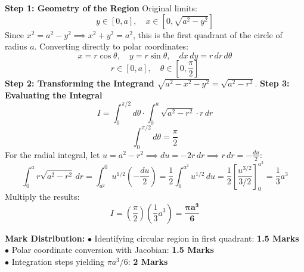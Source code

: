 \begin{solutionbox}
\textbf{Step 1: Geometry of the Region}
Original limits:
\[
y \in [0, a], \quad x \in [0, \sqrt{a^2 - y^2}]
\]
Since $x^2 = a^2 - y^2 \implies x^2 + y^2 = a^2$, this is the first quadrant of the circle of radius $a$.
Converting directly to polar coordinates:
\[
x = r\cos\theta, \quad y = r\sin\theta, \quad dx \, dy = r \, dr \, d\theta
\]
\[
r \in [0, a], \quad \theta \in \left[0, \frac{\pi}{2}\right]
\]
\textbf{Step 2: Transforming the Integrand}
$\sqrt{a^2 - x^2 - y^2} = \sqrt{a^2 - r^2}$.
\textbf{Step 3: Evaluating the Integral}
\[
I = \int_0^{\pi/2} d\theta \cdot \int_0^a \sqrt{a^2 - r^2} \cdot r \, dr
\]
\[
\int_0^{\pi/2} d\theta = \frac{\pi}{2}
\]
For the radial integral, let $u = a^2 - r^2 \implies du = -2r \, dr \implies r \, dr = -\frac{du}{2}$:
\[
\int_0^a r\sqrt{a^2 - r^2} \, dr = \int_{a^2}^0 u^{1/2} \left(-\frac{du}{2}\right) = \frac{1}{2} \int_0^{a^2} u^{1/2} \, du = \frac{1}{2} \left[ \frac{u^{3/2}}{3/2} \right]_0^{a^2} = \frac{1}{3} a^3
\]
Multiply the results:
\[
I = \left(\frac{\pi}{2}\right) \left(\frac{1}{3} a^3\right) = \mathbf{\frac{\pi a^3}{6}}
\]

\begin{markingrubric}
\textbf{Mark Distribution:}
$\bullet$ Identifying circular region in first quadrant: \textbf{1.5 Marks}\\
$\bullet$ Polar coordinate conversion with Jacobian: \textbf{1.5 Marks}\\
$\bullet$ Integration steps yielding $\pi a^3/6$: \textbf{2 Marks}
\end{markingrubric}
\end{solutionbox}

